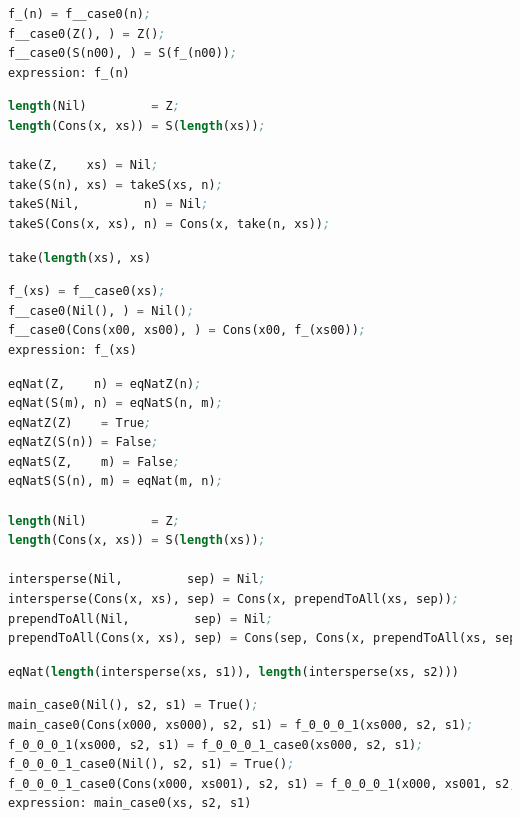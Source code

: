 \documentclass[submission,copyright,creativecommons]{eptcs}
\begin{document}
\begin{lstlisting}[language=Lisp,keywords={},caption=idNat Idempotent Last/Minimal Result]
f_(n) = f__case0(n);
f__case0(Z(), ) = Z();
f__case0(S(n00), ) = S(f_(n00));
expression: f_(n)
\end{lstlisting}

\begin{lstlisting}[language=Lisp,keywords={},caption=take-length Program]
length(Nil)         = Z;
length(Cons(x, xs)) = S(length(xs));

take(Z,    xs) = Nil;
take(S(n), xs) = takeS(xs, n);
takeS(Nil,         n) = Nil;
takeS(Cons(x, xs), n) = Cons(x, take(n, xs));
\end{lstlisting}

\begin{lstlisting}[language=Lisp,keywords={},caption=take-length Expression]
take(length(xs), xs)
\end{lstlisting}

\begin{lstlisting}[language=Lisp,keywords={},caption=take-length Last/Minimal Result]
f_(xs) = f__case0(xs);
f__case0(Nil(), ) = Nil();
f__case0(Cons(x00, xs00), ) = Cons(x00, f_(xs00));
expression: f_(xs)
\end{lstlisting}

\begin{lstlisting}[language=Lisp,keywords={},caption=length-intersperse Program]
eqNat(Z,    n) = eqNatZ(n);
eqNat(S(m), n) = eqNatS(n, m);
eqNatZ(Z)    = True;
eqNatZ(S(n)) = False;
eqNatS(Z,    m) = False;
eqNatS(S(n), m) = eqNat(m, n);

length(Nil)         = Z;
length(Cons(x, xs)) = S(length(xs));

intersperse(Nil,         sep) = Nil;
intersperse(Cons(x, xs), sep) = Cons(x, prependToAll(xs, sep));
prependToAll(Nil,         sep) = Nil;
prependToAll(Cons(x, xs), sep) = Cons(sep, Cons(x, prependToAll(xs, sep)));
\end{lstlisting}

\begin{lstlisting}[language=Lisp,keywords={},caption=length-intersperse Expression]
eqNat(length(intersperse(xs, s1)), length(intersperse(xs, s2)))
\end{lstlisting}

\begin{lstlisting}[language=Lisp,keywords={},caption=length-intersperse Last/Minimal Result]
main_case0(Nil(), s2, s1) = True();
main_case0(Cons(x000, xs000), s2, s1) = f_0_0_0_1(xs000, s2, s1);
f_0_0_0_1(xs000, s2, s1) = f_0_0_0_1_case0(xs000, s2, s1);
f_0_0_0_1_case0(Nil(), s2, s1) = True();
f_0_0_0_1_case0(Cons(x000, xs001), s2, s1) = f_0_0_0_1(x000, xs001, s2, s1);
expression: main_case0(xs, s2, s1)
\end{lstlisting}
\end{document}
